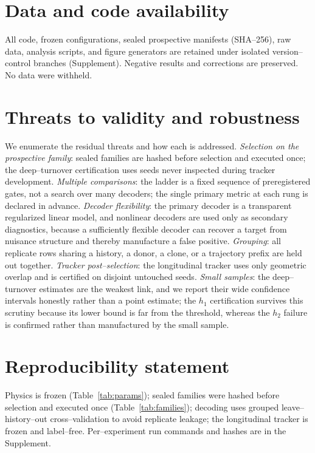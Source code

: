 \documentclass[11pt]{article}
\begin{document}
\section*{Data and code availability}
All code, frozen configurations, sealed prospective manifests (SHA--256), raw data, analysis scripts, and figure
generators are retained under isolated version--control branches (Supplement). Negative results and corrections are
preserved. No data were withheld.

\section*{Threats to validity and robustness}
We enumerate the residual threats and how each is addressed. \emph{Selection on the prospective family}: sealed
families are hashed before selection and executed once; the deep--turnover certification uses seeds never inspected
during tracker development. \emph{Multiple comparisons}: the ladder is a fixed sequence of preregistered gates, not
a search over many decoders; the single primary metric at each rung is declared in advance. \emph{Decoder
flexibility}: the primary decoder is a transparent regularized linear model, and nonlinear decoders are used only as
secondary diagnostics, because a sufficiently flexible decoder can recover a target from nuisance structure and
thereby manufacture a false positive. \emph{Grouping}: all replicate rows sharing a history, a donor, a clone, or a
trajectory prefix are held out together. \emph{Tracker post--selection}: the longitudinal tracker uses only
geometric overlap and is certified on disjoint untouched seeds. \emph{Small samples}: the deep--turnover estimates
are the weakest link, and we report their wide confidence intervals honestly rather than a point estimate; the
$h_1$ certification survives this scrutiny because its lower bound is far from the threshold, whereas the $h_2$
failure is confirmed rather than manufactured by the small sample.

\section*{Reproducibility statement}
Physics is frozen (Table~\ref{tab:params}); sealed families were hashed before selection and executed once
(Table~\ref{tab:families}); decoding uses grouped leave--history--out cross--validation to avoid replicate leakage;
the longitudinal tracker is frozen and label--free. Per--experiment run commands and hashes are in the Supplement.



\end{document}
